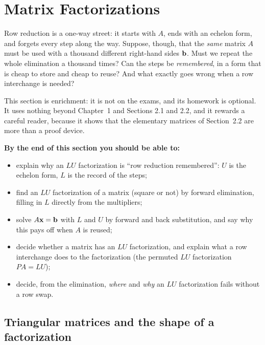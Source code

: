 \documentclass[11pt]{article}
\begin{document}
\section{Matrix Factorizations}

\begin{guide}
Row reduction is a one-way street: it starts with $A$, ends with an echelon form, and forgets every step along the way. Suppose, though, that the \emph{same} matrix $A$ must be used with a thousand different right-hand sides $\mathbf{b}$. Must we repeat the whole elimination a thousand times? Can the steps be \emph{remembered}, in a form that is cheap to store and cheap to reuse? And what exactly goes wrong when a row interchange is needed?
\end{guide}

\begin{remark}
This section is enrichment: it is not on the exams, and its homework is optional. It uses nothing beyond Chapter~1 and Sections 2.1 and 2.2, and it rewards a careful reader, because it shows that the elementary matrices of Section~2.2 are more than a proof device.
\end{remark}

\textbf{By the end of this section you should be able to:}
\begin{itemize}
  \item explain why an $LU$ factorization is ``row reduction remembered'': $U$ is the echelon form, $L$ is the record of the steps;
  \item find an $LU$ factorization of a matrix (square or not) by forward elimination, filling in $L$ directly from the multipliers;
  \item solve $A\mathbf{x}=\mathbf{b}$ with $L$ and $U$ by forward and back substitution, and say why this pays off when $A$ is reused;
  \item decide whether a matrix has an $LU$ factorization, and explain what a row interchange does to the factorization (the permuted $LU$ factorization $PA=LU$);
  \item decide, from the elimination, \emph{where} and \emph{why} an $LU$ factorization fails without a row swap.
\end{itemize}

\subsection*{Triangular matrices and the shape of a factorization}
\end{document}
